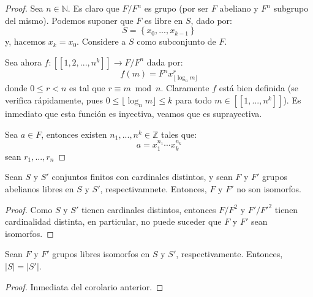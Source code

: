 \documentclass[12pt]{report}
\theoremstyle{largebreak}
\newcommand\abs[1]{\ensuremath{\left|#1\right|}}
\newcommand\cf[3]{\ensuremath{#1:#2\rightarrow#3}}
\newcommand\natint[1]{\ensuremath{\left[\!\left[ #1\right]\!\right]}}
\begin{document}
    \begin{proof}        
        Sea $n\in\mathbb{N}$. Es claro que $F/F^n$ es grupo (por ser $F$ abeliano y $F^n$ subgrupo del mismo). Podemos suponer que $F$ es libre en $S$, dado por:
        \begin{equation*}
            S=\left\{x_0,...,x_{ k-1} \right\}
        \end{equation*}
        y, hacemos $x_k=x_0$. Considere a $S$ como subconjunto de $F$. 
        
        
        Sea ahora $\cf{f}{\natint{1,2,...,n^k}}{F/F^n}$ dada por:
        \begin{equation*}
            f(m)=F^nx_{\lfloor\log_n m \rfloor}^{r}
        \end{equation*}
        donde $0\leq r<n$ es tal que $r\equiv m\bmod n$. Claramente $f$ está bien definida (se verifica rápidamente, pues $0\leq\lfloor\log_nm\rfloor\leq k$ para todo $m\in\natint{1,...,n^k}$). Es inmediato que esta función es inyectiva, veamos que es suprayectiva.

        Sea $a\in F$, entonces existen $n_1,...,n^k\in\mathbb{Z}$ tales que:
        \begin{equation*}
            a=x_1^{ n_1}\cdots x_k^{ n_k}
        \end{equation*}
        sean $r_1,...,r_n$
    \end{proof}

    \begin{cor}
        Sean $S$ y $S'$ conjuntos finitos con cardinales distintos, y sean $F$ y $F'$ grupos abelianos libres en $S$ y $S'$, respectivamnete. Entonces, $F$ y $F'$ no son isomorfos.
    \end{cor}

    \begin{proof}
        Como $S$ y $S'$ tienen cardinales distintos, entonces $F/F^2$ y $F'/F'^{ 2}$ tienen cardinalidad distinta, en particular, no puede suceder que $F$ y $F'$ sean isomorfos.
    \end{proof}

    \begin{cor}
        Sean $F$ y $F'$ grupos libres isomorfos en $S$ y $S'$, respectivamente. Entonces, $\abs{S}=\abs{S'}$.
    \end{cor}

    \begin{proof}
        Inmediata del corolario anterior.
    \end{proof}
\end{document}
